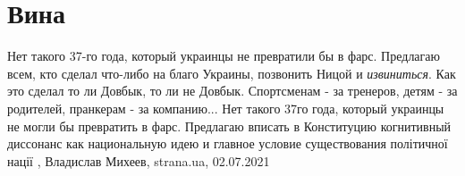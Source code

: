 
 
 
 
 
\chapter{Вина}

Нет такого 37-го года, который украинцы не превратили бы в фарс.  Предлагаю
всем, кто сделал что-либо на благо Украины, позвонить Ницой и \emph{извиниться}. Как
это сделал то ли Довбык, то ли не Довбык.  Спортсменам - за тренеров, детям -
за родителей, пранкерам - за компанию...  Нет такого 37го года, который
украинцы не могли бы превратить в фарс.  Предлагаю вписать в Конституцию
когнитивный диссонанс как национальную идею и главное условие существования
політичної нації
, 
Владислав Михеев, strana.ua, 02.07.2021

